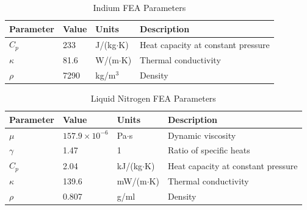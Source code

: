 \documentclass[preprint]{iucr}              %
\begin{document}
\begin{table}
\caption{Indium FEA Parameters}
\begin{tabular}{@{}llll@{}}
Parameter    & Value                  & Units                      & Description                        \\
\hline
$C_p$        & 233                    & J/(kg$\cdot$K)               & Heat capacity at constant pressure \\
$\kappa$     & 81.6                   & W/(m$\cdot$K)                & Thermal conductivity               \\
$\rho$       & 7290                   & kg/m$^3$                   & Density                            \\
\end{tabular}
\label{indiumFEA}
\end{table}


\begin{table}
\caption{Liquid Nitrogen FEA Parameters}
\begin{tabular}{@{}llll@{}}
Parameter    & Value                  & Units                       & Description                        \\
\hline
$\mu$        & $157.9\times 10^{-6}$  & Pa$\cdot$s                  & Dynamic viscosity                  \\ 
$\gamma$     & 1.47                   & 1				            & Ratio of specific heats            \\
$C_p$        & 2.04                   & kJ/(kg$\cdot$K)               & Heat capacity at constant pressure \\
$\kappa$     & 139.6                  & mW/(m$\cdot$K)                & Thermal conductivity               \\
$\rho$       & 0.807                  & g/ml                        & Density                            \\
\end{tabular}
\label{nitrogenFEA}
\end{table}
\end{document}
